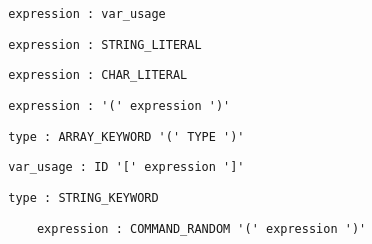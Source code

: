 \documentclass[10pt,landscape]{article}
\begin{document}
\begin{multicols}{3}
		\begin{verbatim}
		expression : var_usage
		\end{verbatim}
		\begin{verbatim}
		expression : STRING_LITERAL
		\end{verbatim}
		\begin{verbatim}
		expression : CHAR_LITERAL
		\end{verbatim}
		\begin{verbatim}
		expression : '(' expression ')'
		\end{verbatim}
		\begin{verbatim}
		type : ARRAY_KEYWORD '(' TYPE ')'
		\end{verbatim}
		\begin{verbatim}
		var_usage : ID '[' expression ']'
		\end{verbatim}
		\begin{verbatim}
		type : STRING_KEYWORD
		\end{verbatim}
		\begin{verbatim}
			expression : COMMAND_RANDOM '(' expression ')'
		\end{verbatim}
		
		
		
		
	\end{multicols}
\end{document}
